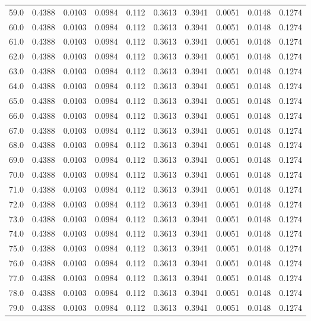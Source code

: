 \begin{longtable}{lrrrrrrrrr}
59.0 & 0.4388 & 0.0103 & 0.0984 & 0.112 & 0.3613 & 0.3941 & 0.0051 & 0.0148 & 0.1274 \\
60.0 & 0.4388 & 0.0103 & 0.0984 & 0.112 & 0.3613 & 0.3941 & 0.0051 & 0.0148 & 0.1274 \\
61.0 & 0.4388 & 0.0103 & 0.0984 & 0.112 & 0.3613 & 0.3941 & 0.0051 & 0.0148 & 0.1274 \\
62.0 & 0.4388 & 0.0103 & 0.0984 & 0.112 & 0.3613 & 0.3941 & 0.0051 & 0.0148 & 0.1274 \\
63.0 & 0.4388 & 0.0103 & 0.0984 & 0.112 & 0.3613 & 0.3941 & 0.0051 & 0.0148 & 0.1274 \\
64.0 & 0.4388 & 0.0103 & 0.0984 & 0.112 & 0.3613 & 0.3941 & 0.0051 & 0.0148 & 0.1274 \\
65.0 & 0.4388 & 0.0103 & 0.0984 & 0.112 & 0.3613 & 0.3941 & 0.0051 & 0.0148 & 0.1274 \\
66.0 & 0.4388 & 0.0103 & 0.0984 & 0.112 & 0.3613 & 0.3941 & 0.0051 & 0.0148 & 0.1274 \\
67.0 & 0.4388 & 0.0103 & 0.0984 & 0.112 & 0.3613 & 0.3941 & 0.0051 & 0.0148 & 0.1274 \\
68.0 & 0.4388 & 0.0103 & 0.0984 & 0.112 & 0.3613 & 0.3941 & 0.0051 & 0.0148 & 0.1274 \\
69.0 & 0.4388 & 0.0103 & 0.0984 & 0.112 & 0.3613 & 0.3941 & 0.0051 & 0.0148 & 0.1274 \\
70.0 & 0.4388 & 0.0103 & 0.0984 & 0.112 & 0.3613 & 0.3941 & 0.0051 & 0.0148 & 0.1274 \\
71.0 & 0.4388 & 0.0103 & 0.0984 & 0.112 & 0.3613 & 0.3941 & 0.0051 & 0.0148 & 0.1274 \\
72.0 & 0.4388 & 0.0103 & 0.0984 & 0.112 & 0.3613 & 0.3941 & 0.0051 & 0.0148 & 0.1274 \\
73.0 & 0.4388 & 0.0103 & 0.0984 & 0.112 & 0.3613 & 0.3941 & 0.0051 & 0.0148 & 0.1274 \\
74.0 & 0.4388 & 0.0103 & 0.0984 & 0.112 & 0.3613 & 0.3941 & 0.0051 & 0.0148 & 0.1274 \\
75.0 & 0.4388 & 0.0103 & 0.0984 & 0.112 & 0.3613 & 0.3941 & 0.0051 & 0.0148 & 0.1274 \\
76.0 & 0.4388 & 0.0103 & 0.0984 & 0.112 & 0.3613 & 0.3941 & 0.0051 & 0.0148 & 0.1274 \\
77.0 & 0.4388 & 0.0103 & 0.0984 & 0.112 & 0.3613 & 0.3941 & 0.0051 & 0.0148 & 0.1274 \\
78.0 & 0.4388 & 0.0103 & 0.0984 & 0.112 & 0.3613 & 0.3941 & 0.0051 & 0.0148 & 0.1274 \\
79.0 & 0.4388 & 0.0103 & 0.0984 & 0.112 & 0.3613 & 0.3941 & 0.0051 & 0.0148 & 0.1274 \\

\end{longtable}
